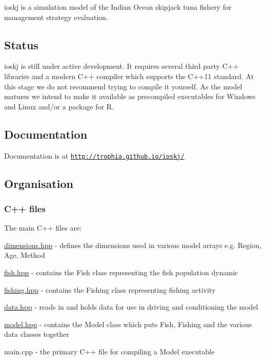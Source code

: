 {\ttfamily ioskj} is a simulation model of the Indian Ocean skipjack tuna fishery for management strategy evaluation.

\subsection*{Status}

{\ttfamily ioskj} is still under active development. It requires several third party C++ libraries and a modern C++ compiler which supports the C++11 standard. At this stage we do not recommend trying to compile it yourself. As the model matures we intend to make it available as precompiled executables for Windows and Linux and/or a package for R.

\subsection*{Documentation}

Documentation is at \href{http://trophia.github.io/ioskj/}{\tt http\-://trophia.\-github.\-io/ioskj/}

\subsection*{Organisation}

\subsubsection*{C++ files}

The main C++ files are\-:


\begin{DoxyItemize}
\item {\ttfamily \hyperlink{dimensions_8hpp_source}{dimensions.\-hpp}} -\/ defines the dimensions used in various model arrays e.\-g. {\ttfamily Region}, {\ttfamily Age}, {\ttfamily Method}
\item {\ttfamily \hyperlink{fish_8hpp_source}{fish.\-hpp}} -\/ contains the {\ttfamily Fish} class representing the fish population dynamic
\item {\ttfamily \hyperlink{fishing_8hpp_source}{fishing.\-hpp}} -\/ contains the {\ttfamily Fishing} class representing fishing activity
\item {\ttfamily \hyperlink{data_8hpp_source}{data.\-hpp}} -\/ reads in and holds data for use in driving and conditioning the model
\item {\ttfamily \hyperlink{model_8hpp_source}{model.\-hpp}} -\/ contains the {\ttfamily Model} class which puts {\ttfamily Fish}, {\ttfamily Fishing} and the various data classes together
\item {\ttfamily main.\-cpp} -\/ the primary C++ file for compiling a {\ttfamily Model} executable
\end{DoxyItemize}

